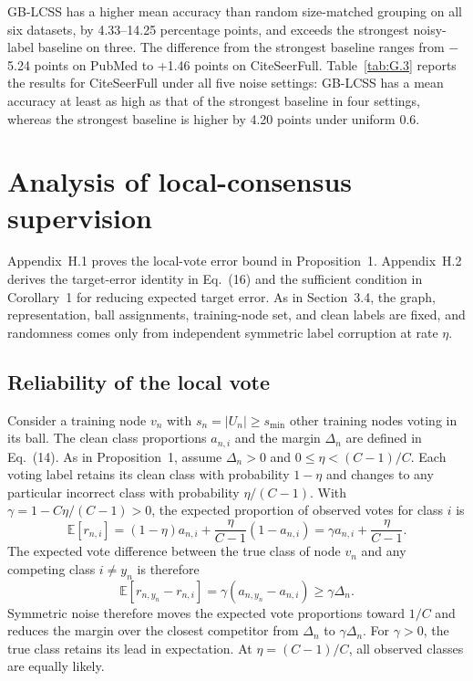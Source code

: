 \documentclass[a4paper,fleqn]{cas-sc}
\begin{document}


GB-LCSS has a higher mean accuracy than random size-matched grouping on all six datasets, by 4.33--14.25 percentage points, and exceeds the strongest noisy-label baseline on three. The difference from the strongest baseline ranges from \ensuremath{-}5.24 points on PubMed to +1.46 points on CiteSeerFull. Table~\ref{tab:G.3} reports the results for CiteSeerFull under all five noise settings: GB-LCSS has a mean accuracy at least as high as that of the strongest baseline in four settings, whereas the strongest baseline is higher by 4.20 points under uniform 0.6.


\setcounter{table}{0}
\section{Analysis of local-consensus supervision}\label{sec:H}
\setcounter{equation}{0}
\renewcommand{\theequation}{H.\arabic{equation}}
\renewcommand{\theHequation}{H.\arabic{equation}}

Appendix~H.1 proves the local-vote error bound in Proposition~1. Appendix~H.2 derives the target-error identity in Eq.~(16) and the sufficient condition in Corollary~1 for reducing expected target error. As in Section~3.4, the graph, representation, ball assignments, training-node set, and clean labels are fixed, and randomness comes only from independent symmetric label corruption at rate \(\eta\).

\subsection{Reliability of the local vote}\label{sec:H.1}

Consider a training node \(v_n\) with \(s_n=|U_n|\geq s_{\min}\) other training nodes voting in its ball. The clean class proportions \(a_{n,i}\) and the margin \(\Delta_n\) are defined in Eq.~(14). As in Proposition~1, assume \(\Delta_n>0\) and \(0\leq\eta<(C-1)/C\). Each voting label retains its clean class with probability \(1-\eta\) and changes to any particular incorrect class with probability \(\eta/(C-1)\). With \(\gamma=1-C\eta/(C-1)>0\), the expected proportion of observed votes for class \(i\) is
\begin{equation}\label{eq:H.1}
\mathbb{E}[r_{n,i}]=(1-\eta)a_{n,i}
+\frac{\eta}{C-1}(1-a_{n,i})
=\gamma a_{n,i}+\frac{\eta}{C-1}.
\end{equation}
The expected vote difference between the true class of node \(v_n\) and any competing class \(i\ne y_n\) is therefore
\begin{equation}\label{eq:H.2}
\mathbb{E}[r_{n,y_n}-r_{n,i}]
=\gamma(a_{n,y_n}-a_{n,i})\geq\gamma\Delta_n.
\end{equation}
Symmetric noise therefore moves the expected vote proportions toward \(1/C\) and reduces the margin over the closest competitor from \(\Delta_n\) to \(\gamma\Delta_n\). For \(\gamma>0\), the true class retains its lead in expectation. At \(\eta=(C-1)/C\), all observed classes are equally likely.
\end{document}
